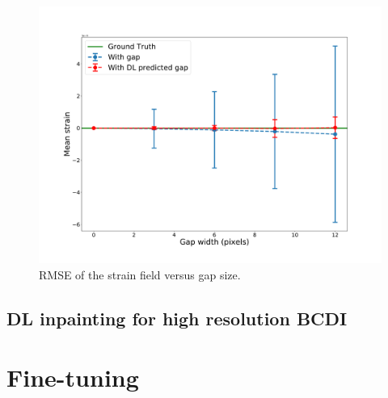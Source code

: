 \begin{figure}[ht]
    \centering
    \includegraphics[width=\textwidth]{figures/Inpainting/avg_strain_comparison-1.pdf}
    \caption{RMSE of the strain field versus gap size.}
    \label{fig:Carnis_avg}
\end{figure}

\subsection{DL inpainting for high resolution BCDI}\label{sec:highres}


\section{Fine-tuning}\label{sec:finetuning}

